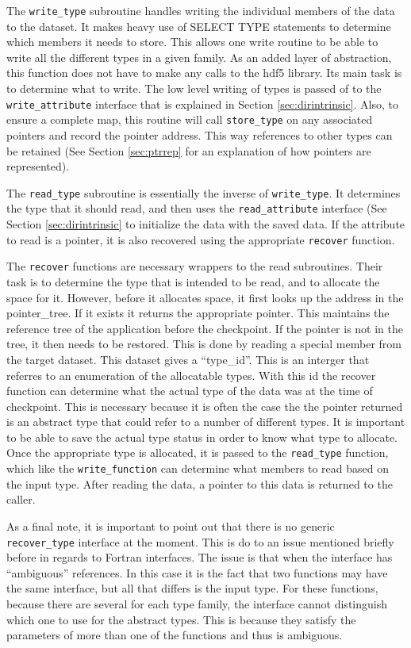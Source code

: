 \documentclass{article}
\begin{document}
The \texttt{write\_type} subroutine handles writing the individual members of the data to the dataset. It makes heavy use of SELECT TYPE statements to determine which members it needs to store. This allows one write routine to be able to write all the different types in a given family. As an added layer of abstraction, this function does not have to make any calls to the hdf5 library. Its main task is to determine what to write. The low level writing of types is passed of to the \texttt{write\_attribute} interface that is explained in Section \ref{sec:dirintrinsic}. Also, to ensure a complete map, this routine will call \texttt{store\_type} on any associated pointers and record the pointer address. This way references to other types can be retained (See Section \ref{sec:ptrrep} for an explanation of how pointers are represented).

The \texttt{read\_type} subroutine is essentially the inverse of \texttt{write\_type}. It determines the type that it should read, and then uses the \texttt{read\_attribute} interface (See Section \ref{sec:dirintrinsic} to initialize the data with the saved data. If the attribute to read is a pointer, it is also recovered using the appropriate \texttt{recover} function.

The \texttt{recover} functions are necessary wrappers to the read subroutines. Their task is to determine the type that is intended to be read, and to allocate the space for it. However, before it allocates space, it first looks up the address in the pointer\_tree. If it exists it returns the appropriate pointer. This maintains the reference tree of the application before the checkpoint. If the pointer is not in the tree, it then needs to be restored. This is done by reading a special member from the target dataset. This dataset gives a ``type\_id''. This is an interger that referres to an enumeration of the allocatable types. With this id the recover function can determine what the actual type of the data was at the time of checkpoint. This is necessary because it is often the case the the pointer returned is an abstract type that could refer to a number of different types. It is important to be able to save the actual type status in order to know what type to allocate. Once the appropriate type is allocated, it is passed to the \texttt{read\_type} function, which like the \texttt{write\_function} can determine what members to read based on the input type. After reading the data, a pointer to this data is returned to the caller.

As a final note, it is important to point out that there is no generic \texttt{recover\_type} interface at the moment. This is do to an issue mentioned briefly before in regards to Fortran interfaces. The issue is that when the interface has ``ambiguous'' references. In this case it is the fact that two functions may have the same interface, but all that differs is the input type. For these functions, because there are several for each type family, the interface cannot distinguish which one to use for the abstract types. This is because they satisfy the parameters of more than one of the functions and thus is ambiguous.
\end{document}
